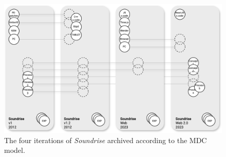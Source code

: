\begin{figure}[!h]
    \includegraphics[width=\linewidth]{chapters/appendix/d/image/graphd-mdc.png}
    \caption{The four iterations of \textit{Soundrise} archived according to the MDC model.}
    \label{fig:ad-graph_mdc}
\end{figure}














